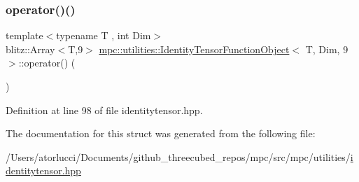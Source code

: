 \subsubsection{\texorpdfstring{operator()()}{operator()()}}
{\footnotesize\ttfamily template$<$typename T , int Dim$>$ \\
blitz\+::\+Array$<$T,9$>$ \mbox{\hyperlink{structmpc_1_1utilities_1_1_identity_tensor_function_object}{mpc\+::utilities\+::\+Identity\+Tensor\+Function\+Object}}$<$ T, Dim, 9 $>$\+::operator() (\begin{DoxyParamCaption}{ }\end{DoxyParamCaption})\hspace{0.3cm}{\ttfamily [inline]}}



Definition at line 98 of file identitytensor.\+hpp.



The documentation for this struct was generated from the following file\+:\begin{DoxyCompactItemize}
\item 
/\+Users/atorlucci/\+Documents/github\+\_\+threecubed\+\_\+repos/mpc/src/mpc/utilities/\mbox{\hyperlink{identitytensor_8hpp}{identitytensor.\+hpp}}\end{DoxyCompactItemize}
